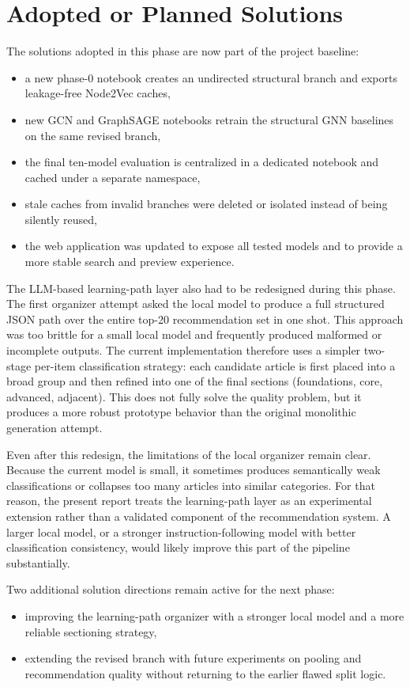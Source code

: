\section{Adopted or Planned Solutions}

The solutions adopted in this phase are now part of the project baseline:
\begin{itemize}
    \item a new phase-0 notebook creates an undirected structural branch and
    exports leakage-free Node2Vec caches,
    \item new GCN and GraphSAGE notebooks retrain the structural GNN baselines
    on the same revised branch,
    \item the final ten-model evaluation is centralized in a dedicated notebook
    and cached under a separate namespace,
    \item stale caches from invalid branches were deleted or isolated instead of
    being silently reused,
    \item the web application was updated to expose all tested models and to
    provide a more stable search and preview experience.
\end{itemize}

The LLM-based learning-path layer also had to be redesigned during this phase.
The first organizer attempt asked the local model to produce a full structured
JSON path over the entire top-20 recommendation set in one shot. This approach
was too brittle for a small local model and frequently produced malformed or
incomplete outputs. The current implementation therefore uses a simpler
two-stage per-item classification strategy: each candidate article is first
placed into a broad group and then refined into one of the final sections
(foundations, core, advanced, adjacent). This does not fully solve the quality
problem, but it produces a more robust prototype behavior than the original
monolithic generation attempt.

Even after this redesign, the limitations of the local organizer remain clear.
Because the current model is small, it sometimes produces semantically weak
classifications or collapses too many articles into similar categories. For
that reason, the present report treats the learning-path layer as an
experimental extension rather than a validated component of the recommendation
system. A larger local model, or a stronger instruction-following model with
better classification consistency, would likely improve this part of the
pipeline substantially.

Two additional solution directions remain active for the next phase:
\begin{itemize}
    \item improving the learning-path organizer with a stronger local model and
    a more reliable sectioning strategy,
    \item extending the revised branch with future experiments on pooling and
    recommendation quality without returning to the earlier flawed split logic.
\end{itemize}
